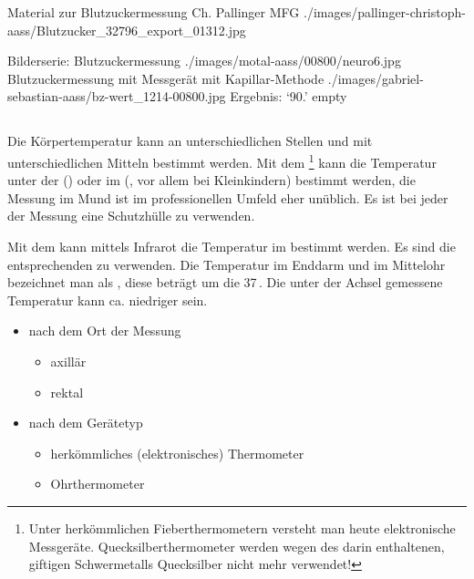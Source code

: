 \Picture
{Material zur Blutzuckermessung}%
{}%
{}%
{Ch. Pallinger}%
{MFG}%
{./images/pallinger-christoph-aass/Blutzucker_32796_export_01312.jpg}%
{}%

\begin{PictureSeries}{}{Bilderserie: Blutzuckermessung}
{./images/motal-aass/00800/neuro6.jpg}
{Blutzuckermessung mit Messgerät mit Kapillar-Methode }
{./images/gabriel-sebastian-aass/bz-wert_1214-00800.jpg}
{Ergebnis: \enquote*{90\MgDl*.} }
{empty}
{}
{}
{}
\end{PictureSeries}






\subsection{}

{%
\label{topic:koerpertemperatur-messung}%
Die Körpertemperatur kann an unterschiedlichen Stellen und
mit unterschiedlichen Mitteln bestimmt werden. 
Mit dem
\footnote{Unter
herkömmlichen Fieberthermometern versteht man heute
elektronische Messgeräte. Quecksilberthermometer werden
wegen des darin enthaltenen, giftigen Schwermetalls
Quecksilber nicht mehr verwendet!} kann die Temperatur unter
der  () oder im 
(, vor allem bei Kleinkindern) bestimmt werden, 
die Messung im Mund ist im professionellen Umfeld 
eher unüblich. Es ist
bei jeder der Messung eine Schutzhülle zu verwenden.

Mit dem  kann mittels Infrarot die
Temperatur im  bestimmt werden. Es sind die
entsprechenden  zu verwenden.
Die Temperatur im Enddarm und im Mittelohr bezeichnet man
als , diese beträgt um die
37\,\DegC. Die unter der Achsel gemessene Temperatur kann
ca. \DegC* niedriger sein.
}{
\begin{itemize}
  \item nach dem Ort der Messung
  \begin{itemize}
    \item axillär
    \item rektal
  \end{itemize}
  \item nach dem Gerätetyp
  \begin{itemize}
    \item herkömmliches (elektronisches) Thermometer
    \item Ohrthermometer
  \end{itemize}
\end{itemize}
}{}{}{}

